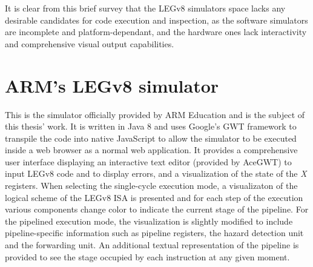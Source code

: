 It is clear from this brief survey that the LEGv8 simulators space lacks any desirable candidates for code execution and inspection, as the software simulators are incomplete and platform-dependant, and the hardware ones lack interactivity and comprehensive visual output capabilities.

\section*{ARM's LEGv8 simulator}

This is the simulator officially provided by ARM Education and is the subject of this thesis' work. It is written in Java 8 and uses Google's GWT framework to transpile the code into native JavaScript to allow the simulator to be executed inside a web browser as a normal web application. It provides a comprehensive user interface displaying an interactive text editor (provided by AceGWT) to input LEGv8 code and to display errors, and a visualization of the state of the \emph{X} registers.
When selecting the single-cycle execution mode, a visualizaton of the logical scheme of the LEGv8 ISA is presented and for each step of the execution various components change color to indicate the current stage of the pipeline. For the pipelined execution mode, the visualization is slightly modified to include pipeline-specific information such as pipeline registers, the hazard detection unit and the forwarding unit. An additional textual representation of the pipeline is provided to see the stage occupied by each instruction at any given moment.


